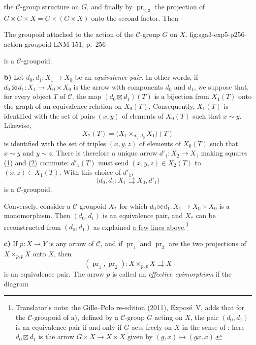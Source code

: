 
the \(\mathscr C\)-group structure on \(G\), and finally by
\(\operatorname{pr}_{2,3}\) the projection of
\(G\times G\times X=G\times(G\times X)\) onto the second factor. Then

  {The groupoid attached to the action of the \(\mathscr C\)-group \(G\) on \(X\).}
  {fig:sga3-exp5-p256-action-groupoid}
  {LNM 151, p.~256}

\noindent is a \(\mathscr C\)-groupoid.

\medskip
{}\label{par:sga3-V-2-b}%
\noindent\textbf{b)} Let \(d_0,d_1:X_1\to X_0\) be an
\emph{equivalence pair}. In other words, if
\(d_0\boxtimes d_1:X_1\to X_0\times X_0\) is the arrow with components
\(d_0\) and \(d_1\), we suppose that, for every object \(T\) of
\(\mathscr C\), the map \((d_0\boxtimes d_1)(T)\) is a bijection from
\(X_1(T)\) onto the graph of an equivalence relation on \(X_0(T)\).
Consequently, \(X_1(T)\) is identified with the set of pairs \((x,y)\) of
elements of \(X_0(T)\) such that \(x\sim y\). Likewise,
\[
  X_2(T)=\bigl(X_1\times_{d_1,d_0}X_1\bigr)(T)
\]
is identified with the set of triples \((x,y,z)\) of elements of
\(X_0(T)\) such that \(x\sim y\) and \(y\sim z\). There is therefore a
unique arrow \(d'_1:X_2\to X_1\) making squares
\hyperref[sga3:v:lemma:1-2:equation:1]{(1)} and
\hyperref[sga3:v:lemma:1-2:equation:2]{(2)} commute: \(d'_1(T)\) must send
\((x,y,z)\in X_2(T)\) to \((x,z)\in X_1(T)\). With this choice of
\(d'_1\),
\[
  \bigl(d_0,d_1:X_1\rightrightarrows X_0,d'_1\bigr)
\]
is a \(\mathscr C\)-groupoid.

Conversely, consider a \(\mathscr C\)-groupoid \(X_\ast\) for which
\(d_0\boxtimes d_1:X_1\to X_0\times X_0\) is a monomorphism. Then
\((d_0,d_1)\) is an equivalence pair, and \(X_\ast\) can be reconstructed
from \((d_0,d_1)\) as explained \hyperref[par:sga3-V-2-b]{a few lines above}.\footnote{Translator's note: the Gille--Polo re-edition (2011), Exposé~V, adds
that for the \(\mathscr C\)-groupoid of a), defined by a \(\mathscr C\)-group
\(G\) acting on \(X\), the pair \((d_0,d_1)\) is an equivalence pair if and
only if \(G\) acts freely on \(X\) in the sense of
: here \(d_0\boxtimes d_1\) is the arrow
\(G\times X\to X\times X\) given by \((g,x)\mapsto(gx,x)\).}

\medskip
{}\label{par:sga3-V-2-c}%
\noindent\textbf{c)} If \(p:X\to Y\) is any arrow of \(\mathscr C\), and
if \(\operatorname{pr}_1\) and \(\operatorname{pr}_2\) are the two
projections of \(X\times_{p,p}X\) onto \(X\), then
\[
  (\operatorname{pr}_1,\operatorname{pr}_2):
  X\times_{p,p}X\rightrightarrows X
\]
is an equivalence pair. The arrow \(p\) is called an
\emph{effective epimorphism} if the diagram

